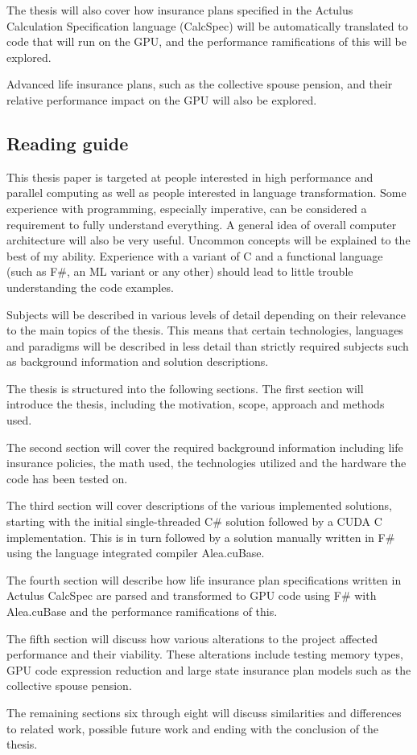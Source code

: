 The thesis will also cover how insurance plans specified in the Actulus Calculation Specification language (CalcSpec) will be automatically translated to code that will run on the GPU, and the performance ramifications of this will be explored.

Advanced life insurance plans, such as the collective spouse pension, and their relative performance impact on the GPU will also be explored.

\subsection{Reading guide}
This thesis paper is targeted at people interested in high performance and parallel computing as well as people interested in language transformation. 
Some experience with programming, especially imperative, can be considered a requirement to fully understand everything. 
A general idea of overall computer architecture will also be very useful. 
Uncommon concepts will be explained to the best of my ability. 
Experience with a variant of C and a functional language (such as F\#, an ML variant or any other) should lead to little trouble understanding the code examples.

Subjects will be described in various levels of detail depending on their relevance to the main topics of the thesis.
This means that certain technologies, languages and paradigms will be described in less detail than strictly required subjects such as background information and solution descriptions.

The thesis is structured into the following sections.
The first section will introduce the thesis, including the motivation, scope, approach and methods used.

The second section will cover the required background information including life insurance policies, the math used, the technologies utilized and the hardware the code has been tested on.

The third section will cover descriptions of the various implemented solutions, starting with the initial single-threaded C\# solution followed by a CUDA C implementation. 
This is in turn followed by a solution manually written in F\# using the language integrated compiler Alea.cuBase.

The fourth section will describe how life insurance plan specifications written in Actulus CalcSpec are parsed and transformed to GPU code using F\# with Alea.cuBase and the performance ramifications of this.

The fifth section will discuss how various alterations to the project affected performance and their viability. 
These alterations include testing memory types, GPU code expression reduction and large state insurance plan models such as the collective spouse pension.

The remaining sections six through eight will discuss similarities and differences to related work, possible future work and ending with the conclusion of the thesis.